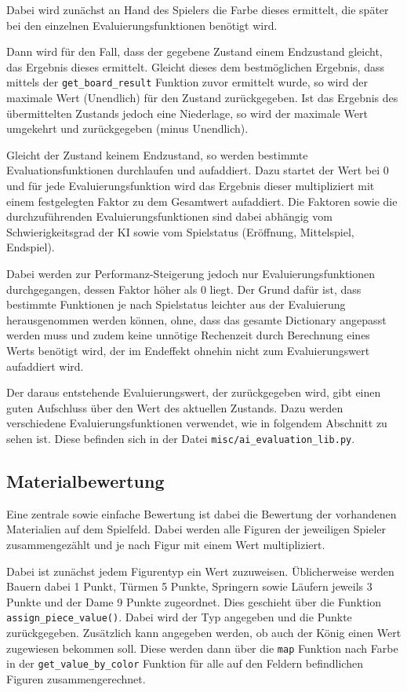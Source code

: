     Dabei wird zunächst an Hand des Spielers die Farbe dieses ermittelt, die
später bei den einzelnen Evaluierungsfunktionen benötigt wird.

Dann wird für den Fall, dass der gegebene Zustand einem Endzustand
gleicht, das Ergebnis dieses ermittelt. Gleicht dieses dem bestmöglichen
Ergebnis, dass mittels der \texttt{get\_board\_result} Funktion zuvor
ermittelt wurde, so wird der maximale Wert (Unendlich)
für den Zustand zurückgegeben. Ist das Ergebnis des übermittelten
Zustands jedoch eine Niederlage, so wird der maximale Wert umgekehrt und
zurückgegeben (minus Unendlich).

Gleicht der Zustand keinem Endzustand, so werden bestimmte
Evaluationsfunktionen durchlaufen und aufaddiert. Dazu startet der Wert
bei 0 und für jede Evaluierungsfunktion wird das Ergebnis dieser
multipliziert mit einem festgelegten Faktor zu dem Gesamtwert
aufaddiert. Die Faktoren sowie die durchzuführenden
Evaluierungsfunktionen sind dabei abhängig vom Schwierigkeitsgrad der KI
sowie vom Spielstatus (Eröffnung, Mittelspiel, Endspiel).

Dabei werden zur Performanz-Steigerung jedoch nur Evaluierungsfunktionen
durchgegangen, dessen Faktor höher als 0 liegt. Der Grund dafür ist,
dass bestimmte Funktionen je nach Spielstatus leichter aus der
Evaluierung herausgenommen werden können, ohne, dass das gesamte
Dictionary angepasst werden muss und zudem keine unnötige Rechenzeit
durch Berechnung eines Werts benötigt wird, der im Endeffekt ohnehin
nicht zum Evaluierungswert aufaddiert wird.

Der daraus entstehende Evaluierungswert, der zurückgegeben wird, gibt
einen guten Aufschluss über den Wert des aktuellen Zustands. Dazu werden
verschiedene Evaluierungsfunktionen verwendet, wie in folgendem
Abschnitt zu sehen ist. Diese befinden sich in der Datei
\texttt{misc/ai\_evaluation\_lib.py}.

    \subsection{Materialbewertung}\label{materialbewertung}

Eine zentrale sowie einfache Bewertung ist dabei die Bewertung der
vorhandenen Materialien auf dem Spielfeld. Dabei werden alle Figuren der
jeweiligen Spieler zusammengezählt und je nach Figur mit einem Wert
multipliziert.

Dabei ist zunächst jedem Figurentyp ein Wert zuzuweisen. Üblicherweise
werden Bauern dabei 1 Punkt, Türmen 5 Punkte, Springern sowie Läufern
jeweils 3 Punkte und der Dame 9 Punkte zugeordnet. Dies geschieht über
die Funktion \texttt{assign\_piece\_value()}. Dabei wird der Typ
angegeben und die Punkte zurückgegeben. Zusätzlich kann angegeben
werden, ob auch der König einen Wert zugewiesen bekommen soll. Diese
werden dann über die \texttt{map} Funktion nach Farbe in der
\texttt{get\_value\_by\_color} Funktion für alle auf den Feldern
befindlichen Figuren zusammengerechnet.

